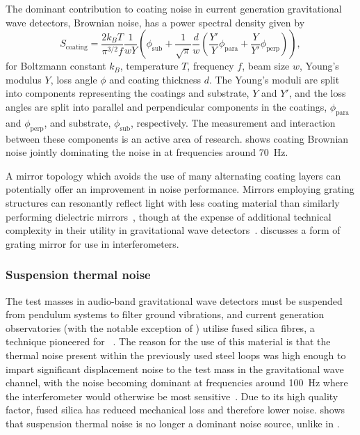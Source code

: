 The dominant contribution to coating noise in current generation gravitational wave detectors, Brownian noise, has a power spectral density given by~\cite{Harry2002}
\begin{equation}
  \label{eq:coating-brownian-psd}
  S_{\text{coating}} = \frac{2 k_B T}{\pi^{3/2} f} \frac{1}{w Y} \left( \phi_{\text{sub}} + \frac{1}{\sqrt{\pi}} \frac{d}{w} \left( \frac{Y'}{Y} \phi_{\text{para}} + \frac{Y}{Y'} \phi_{\text{perp}} \right) \right),
\end{equation}
for Boltzmann constant $k_B$, temperature $T$, frequency $f$, beam size $w$, Young's modulus $Y$, loss angle $\phi$ and coating thickness $d$. The Young's moduli are split into components representing the coatings and substrate, $Y$ and $Y'$, and the loss angles are split into parallel and perpendicular components in the coatings, $\phi_{\text{para}}$ and $\phi_{\text{perp}}$, and substrate, $\phi_{\text{sub}}$, respectively. The measurement and interaction between these components is an active area of research.  shows coating Brownian noise jointly dominating the noise in \ALIGO{} at frequencies around \SI{70}{\hertz}.

A mirror topology which avoids the use of many alternating coating layers can potentially offer an improvement in noise performance. Mirrors employing grating structures can resonantly reflect light with less coating material than similarly performing dielectric mirrors~\cite{Mashev1985}, though at the expense of additional technical complexity in their utility in gravitational wave detectors~\cite{Leavey2015}.  discusses a form of grating mirror for use in interferometers.

\subsubsection{\label{sec:sus-thermal-noise}Suspension thermal noise}
The test masses in audio-band gravitational wave detectors must be suspended from pendulum systems to filter ground vibrations, and current generation observatories (with the notable exception of \KAGRA{}) utilise fused silica fibres, a technique pioneered for \GEO{}~\cite{Barr2002}. The reason for the use of this material is that the thermal noise present within the previously used steel loops was high enough to impart significant displacement noise to the test mass in the gravitational wave channel, with the noise becoming dominant at frequencies around \SI{100}{\hertz} where the interferometer would otherwise be most sensitive~\cite{Hammond2012}. Due to its high quality factor, fused silica has reduced mechanical loss and therefore lower noise.  shows that suspension thermal noise is no longer a dominant noise source, unlike in \ILIGO{}.

